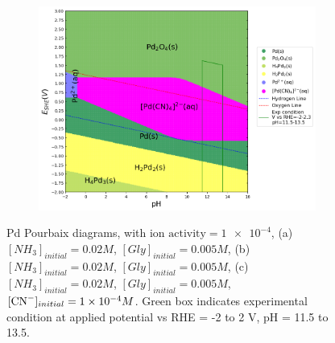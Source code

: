 \documentclass[journal=jacsat,manuscript=article]{achemso}
\begin{document}
\begin{figure}[htbp]
\begin{subfigure}[b]{0.3\textwidth}
    \end{subfigure}
    \begin{subfigure}[b]{0.3\textwidth}
        \subcaption{}\label{fig:Pd_Pourbaix_NH3_Gly_CN}
        \includegraphics[width=\textwidth]{Figures/pourbaix_diagrams/Pd-NH3-H2O_activity=1e-04_[NH3]=0.02M_[Gly]=0.005M_[CN]=0.0001.png}
        \par\medskip   
    \end{subfigure}

    \caption{Pd Pourbaix diagrams, with $\text{ion activity}=\num{1e-4}$, (a)$[NH_3]_{initial}= 0.02M$, $[Gly]_{initial}=0.005M$, (b)$[NH_3]_{initial}= 0.02M$, $[Gly]_{initial}=0.005M$, (c)$[NH_3]_{initial}= 0.02M$, $[Gly]_{initial}=0.005M$, $[\ce{CN-}]_{initial}=\num{1e-4}M$. Green box indicates experimental condition at applied potential vs RHE = -2 to 2 V, pH = 11.5 to 13.5.}
    \label{fig:Pd_Pourbaix}
\end{figure}
\end{document}

